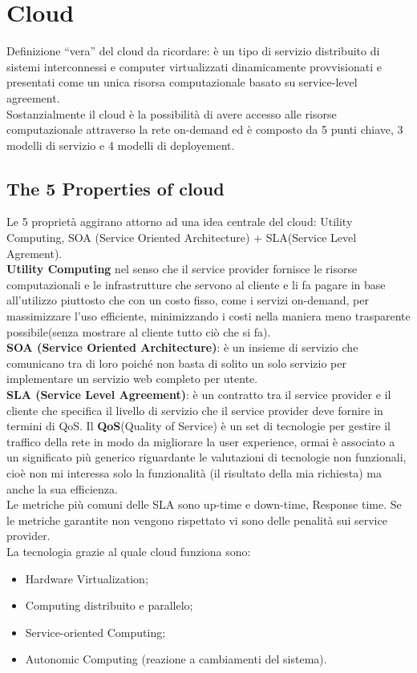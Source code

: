 \documentclass[11pt, twocolumn]{article}
\newenvironment{myitemize}
{ \begin{itemize}[topsep=0ex]
		\setlength{\itemsep}{0pt}
		\setlength{\parskip}{0pt}
		\setlength{\parsep}{0pt}     }
	{ \end{itemize}                  }
\begin{document}
\section{Cloud}
Definizione ``vera'' del cloud da ricordare: è un tipo di servizio distribuito di sistemi interconnessi e computer virtualizzati dinamicamente provvisionati e presentati come un unica risorsa computazionale basato su service-level agreement.
\\
Sostanzialmente il cloud è la possibilità di avere accesso alle risorse computazionale attraverso la rete on-demand ed è composto da 5 punti chiave, 3 modelli di servizio e 4 modelli di deployement.

\subsection{The 5 Properties of cloud}
Le 5 proprietà aggirano attorno ad una idea centrale del cloud: Utility Computing, SOA (Service Oriented Architecture) + SLA(Service Level Agrement).\\
\textbf{Utility Computing} nel senso che il service provider fornisce le risorse computazionali e le infrastrutture che servono al cliente e li fa pagare in base all'utilizzo piuttosto che con un costo fisso, come i servizi on-demand, per massimizzare l'uso efficiente, minimizzando i costi nella maniera meno trasparente possibile(senza mostrare al cliente tutto ciò che si fa).\\
\textbf{SOA (Service Oriented Architecture)}: è un insieme di servizio che comunicano tra di loro poiché non basta di solito un solo servizio per implementare un servizio web completo per utente.\\
\textbf{SLA (Service Level Agreement)}: è un contratto tra il service provider e il cliente che specifica il livello di servizio che il service provider deve fornire in termini di QoS.
Il \textbf{QoS}(Quality of Service) è un set di tecnologie per gestire il traffico della rete in modo da migliorare la user experience, ormai è associato a un significato più generico riguardante le valutazioni di tecnologie non funzionali, cioè non mi interessa solo la funzionalità (il risultato della mia richiesta) ma anche la sua efficienza.\\
Le metriche più comuni delle SLA sono up-time e down-time, Response time. Se le metriche garantite non vengono rispettato vi sono delle penalità sui service provider.\\
La tecnologia grazie al quale cloud funziona sono:
\begin{myitemize}
	\item Hardware Virtualization;
	\item Computing distribuito e parallelo;
	\item Service-oriented Computing;
	\item Autonomic Computing (reazione a cambiamenti del sistema).
\end{myitemize}
\end{document}
